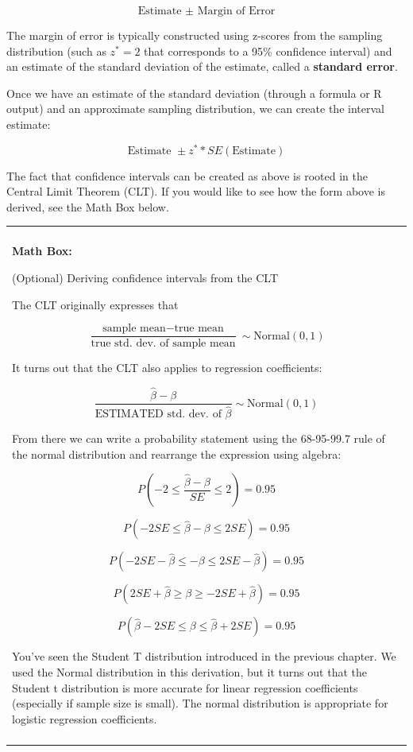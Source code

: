 \documentclass[
]{book}
\newenvironment{mathbox}
{
    \begin{center}
    
    \begin{tabular}{|p{0.8\textwidth}|}
    \rowcolor{LightYellow}
    \hline\\
    \rowcolor{LightYellow}
    \textbf{Math Box:}
}
{
    \\\rowcolor{LightYellow}
    \\\hline
    \end{tabular} 
    \end{center}
}
\begin{document}
\[\text{Estimate }\pm \text{ Margin of Error}\]

The margin of error is typically constructed using z-scores from the sampling distribution (such as \(z^* = 2\) that corresponds to a 95\% confidence interval) and an estimate of the standard deviation of the estimate, called a \textbf{standard error}.

Once we have an estimate of the standard deviation (through a formula or R output) and an approximate sampling distribution, we can create the interval estimate:

\[\text{Estimate }\pm z^* *SE(\text{Estimate})\]

The fact that confidence intervals can be created as above is rooted in the Central Limit Theorem (CLT). If you would like to see how the form above is derived, see the Math Box below.

\begin{mathbox}
(Optional) Deriving confidence intervals from the CLT

The CLT originally expresses that

\[\frac{\text{sample mean} - \text{true mean}}{\text{true std. dev. of sample mean}} \sim \text{Normal}(0,1)\]

It turns out that the CLT also applies to regression coefficients:

\[\frac{\hat{\beta} - \beta}{\text{ESTIMATED std. dev. of }\hat{\beta}} \sim \text{Normal}(0,1)\]

From there we can write a probability statement using the 68-95-99.7
rule of the normal distribution and rearrange the expression using
algebra:

\[P(-2\leq\frac{\hat{\beta} - \beta}{SE}\leq2) = 0.95\]

\[P(-2 SE\leq\hat{\beta} - \beta \leq2 SE ) = 0.95\]

\[P(-2 SE-\hat{\beta} \leq  -\beta \leq2 SE-\hat{\beta} ) = 0.95\]

\[P(2 SE+\hat{\beta} \geq \beta \geq -2 SE+\hat{\beta} ) = 0.95\]

\[P(\hat{\beta}-2 SE \leq \beta \leq\hat{\beta}+2 SE ) = 0.95\]

You've seen the Student T distribution introduced in the previous
chapter. We used the Normal distribution in this derivation, but it
turns out that the Student t distribution is more accurate for linear
regression coefficients (especially if sample size is small). The normal
distribution is appropriate for logistic regression coefficients.
\end{mathbox}
\end{document}

